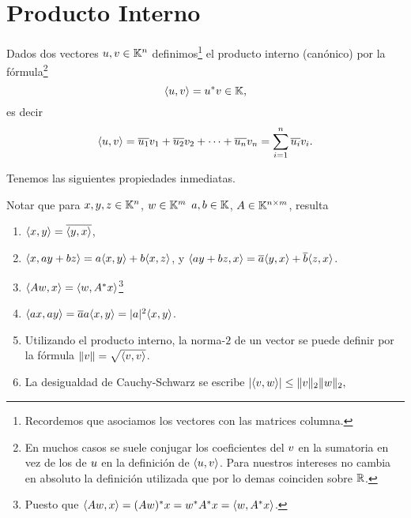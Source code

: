 \section{Producto Interno}
\tccdefi
\begin{defi}
Dados dos vectores $\ub, \vb \in \K^n$ definimos\footnote{Recordemos que asociamos los vectores con las matrices columna.} el producto interno (canónico) por la fórmula\footnote{En muchos casos se suele conjugar los coeficientes del $\vb$ en la sumatoria en vez de los de $\ub$  en la definición de $\langle \ub,\vb\rangle$. Para nuestros intereses no cambia en absoluto la definición utilizada que por lo demas coinciden sobre $\mathbb R$.} $$
\langle \ub, \vb \rangle = \ub^*\vb\in \K,
$$
es decir
$$
\langle \ub, \vb \rangle=\overline{u_1} v_1 + \overline{u_2} v_2 + \dots + \overline{u_n} v_n = \sum_{i=1}^{n} \overline{u_i}v_i.
$$
\end{defi}
\etcc
Tenemos las siguientes propiedades inmediatas.

\tcc
\begin{rem}
\label{obs:interno}
Notar que para $\xb,\yb,\zb \in \K^n$, $\wb\in \K^m$ $a,b \in \mathbb K$,  $\Ab\in \K^{n \times m}$, resulta

\begin{enumerate}
\item   $\langle \xb, \yb \rangle= \overline{\langle \yb, \xb \rangle}$,
\item   $\langle \xb, a\yb + b\zb \rangle = a \langle \xb, \yb \rangle + b \langle \xb, \zb \rangle$,  y $\langle a\yb + b\zb,\xb \rangle = \overline{a} \langle \yb, \xb \rangle + \overline{b} \langle \zb, \xb \rangle$.
\item  $\langle \Ab\wb, \xb \rangle = \langle  \wb,\Ab^* \xb \rangle$\footnote{Puesto que $\langle \Ab\wb, \xb \rangle = (\Ab\wb)^*\xb=\wb^*\Ab^*\xb= \langle  \wb,\Ab^* \xb \rangle$.}
  \item $\langle a\xb, a\yb \rangle = \overline{a}a \langle \xb, \yb \rangle=|a|^2 \langle \xb, \yb \rangle$.
\item  Utilizando el producto interno, la norma-$2$ de un vector se puede definir por la fórmula $\|\vb\| = \sqrt{\langle \vb, \vb\rangle}$.
\item La desigualdad de Cauchy-Schwarz se escribe
$|\langle \vb,\wb\rangle|\le \|\vb\|_2\|\wb\|_2,$
 \end{enumerate}
\end{rem}
\etcc

